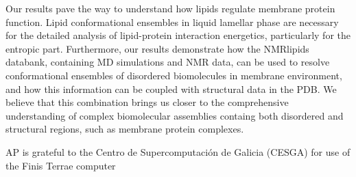 \documentclass[aps,prl,superscriptaddress,twocolumn]{revtex4}
\begin{document}
Our results pave the way to understand how lipids regulate membrane protein function.
Lipid conformational ensembles in liquid lamellar phase are necessary
for the detailed analysis of lipid-protein interaction energetics,
particularly for the entropic part. 
Furthermore, our results demonstrate how the NMRlipids databank, containing MD simulations and NMR data,
can be used to resolve
conformational ensembles of disordered biomolecules in membrane environment,
and how this information can be coupled with structural data in the PDB.
We believe that this combination brings us closer to the comprehensive understanding of
complex biomolecular assemblies containg both disordered and structural regions, such as membrane
protein complexes.



%

\begin{acknowledgments}
AP is grateful to the Centro de
Supercomputación de Galicia (CESGA) for use of the Finis
Terrae computer
\end{acknowledgments}
\end{document}
